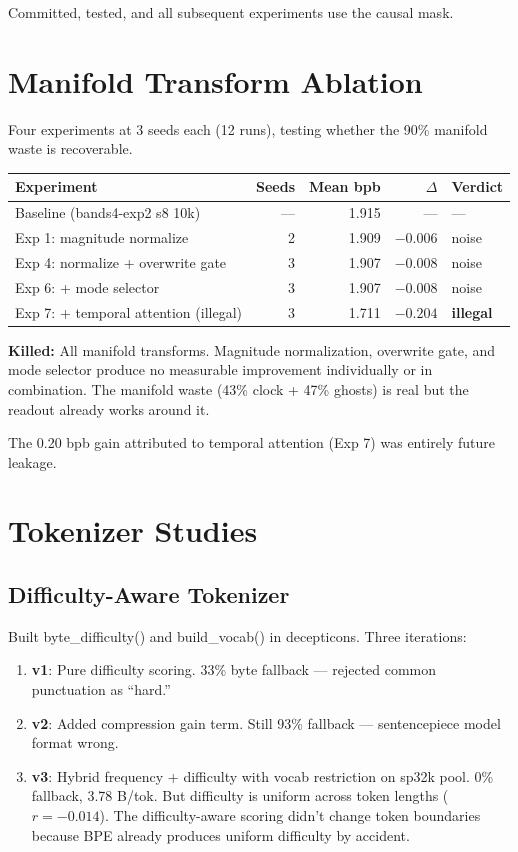 \documentclass[11pt,a4paper]{report}
\newcommand{\killed}[1]{\textcolor{killed}{\textbf{Killed:}} #1}
\begin{document}
Committed, tested, and all subsequent experiments use the causal mask.


\chapter{Manifold Transform Ablation}

Four experiments at 3 seeds each (12 runs), testing whether the 90\% manifold waste is recoverable.

\begin{table}[h]
\centering
\begin{tabular}{lrrrl}
\toprule
\textbf{Experiment} & \textbf{Seeds} & \textbf{Mean bpb} & \textbf{$\Delta$} & \textbf{Verdict} \\
\midrule
Baseline (bands4-exp2 s8 10k) & --- & 1.915 & --- & --- \\
Exp 1: magnitude normalize & 2 & 1.909 & $-0.006$ & noise \\
Exp 4: normalize + overwrite gate & 3 & 1.907 & $-0.008$ & noise \\
Exp 6: + mode selector & 3 & 1.907 & $-0.008$ & noise \\
Exp 7: + temporal attention (illegal) & 3 & 1.711 & $-0.204$ & \textbf{illegal} \\
\bottomrule
\end{tabular}
\end{table}

\killed{All manifold transforms. Magnitude normalization, overwrite gate, and mode selector produce no measurable improvement individually or in combination. The manifold waste (43\% clock + 47\% ghosts) is real but the readout already works around it.}

The 0.20 bpb gain attributed to temporal attention (Exp 7) was entirely future leakage.


\chapter{Tokenizer Studies}

\section{Difficulty-Aware Tokenizer}

Built byte\_difficulty() and build\_vocab() in decepticons. Three iterations:

\begin{enumerate}
\item \textbf{v1}: Pure difficulty scoring. 33\% byte fallback --- rejected common punctuation as ``hard.''
\item \textbf{v2}: Added compression gain term. Still 93\% fallback --- sentencepiece model format wrong.
\item \textbf{v3}: Hybrid frequency + difficulty with vocab restriction on sp32k pool. 0\% fallback, 3.78 B/tok. But difficulty is uniform across token lengths ($r = -0.014$). The difficulty-aware scoring didn't change token boundaries because BPE already produces uniform difficulty by accident.
\end{enumerate}
\end{document}
